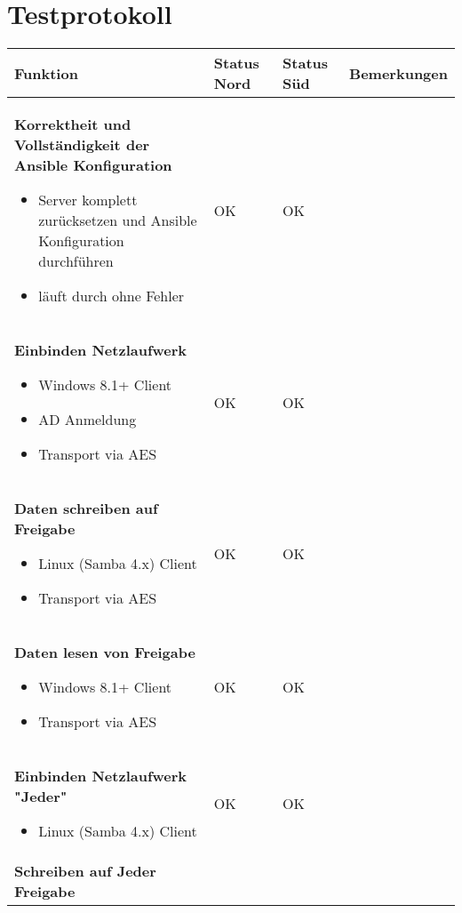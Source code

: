 \section{Testprotokoll}
\label{tab:massnahmen}
\begin{longtable}{p{6.8cm}p{2.4cm}p{2.4cm}p{3cm}}
\toprule
Funktion & Status Nord & Status Süd & Bemerkungen \\
\midrule
\textbf{Korrektheit und Vollständigkeit der Ansible Konfiguration }
\begin{itemize}
\item
  Server komplett zurücksetzen und Ansible Konfiguration durchführen
\item
  läuft durch ohne Fehler
\end{itemize} & OK & OK & \\
\midrule
\textbf{Einbinden Netzlaufwerk}

\begin{itemize}
\item
  Windows 8.1+ Client
\item
  AD Anmeldung
\item
  Transport via AES
\end{itemize} & OK & OK & \\
\midrule
\textbf{Daten schreiben auf Freigabe}

\begin{itemize}
\item
  Linux (Samba 4.x) Client
\end{itemize}

\begin{itemize}
\item
  Transport via AES
\end{itemize} & OK & OK & \\
\midrule
\textbf{Daten lesen von Freigabe}

\begin{itemize}
\item
  Windows 8.1+ Client
\item
  Transport via AES
\end{itemize} & OK & OK & \\
\midrule
\textbf{Einbinden Netzlaufwerk "Jeder"}

\begin{itemize}
\item
  Linux (Samba 4.x) Client
\end{itemize} & OK & OK & \\
\midrule
\textbf{Schreiben auf Jeder Freigabe }


\end{longtable}
